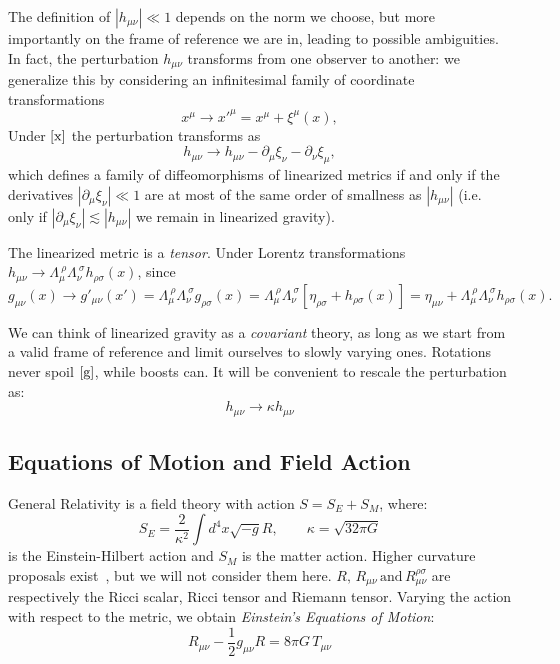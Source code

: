 \documentclass[12pt,a4paper,oneside]{article}
\numberwithin{equation}{section}   %
\begin{document}
The definition of $|h_{\mu\nu}|\ll1$ depends on the norm we choose, but more 
importantly on 
the frame of reference we are in, leading to possible ambiguities.
In fact, the perturbation $h_{\mu\nu}$ transforms from one observer to another:
we generalize this by considering an infinitesimal family of coordinate transformations
\begin{equation}
x^\mu \rightarrow x'^\mu = x^\mu + \xi^\mu(x), \label{x}
\end{equation}
Under $\eqref{x}$ the perturbation transforms as
\begin{equation}\label{gauge}
\boxed{h_{\mu\nu} \to h_{\mu\nu} - \partial_\mu \xi_\nu - \partial_\nu \xi_\mu},    
\end{equation}
which defines a family of diffeomorphisms 
of linearized metrics if and only if the derivatives 
$|\partial_\mu \xi_\nu| \ll 1$ are at most of the same order of 
smallness as $|h_{\mu\nu}|$ (i.e. only if $|\partial_\mu \xi_\nu| \lesssim |h_{\mu\nu}|$
we remain in linearized gravity).

The linearized metric is a \textit{tensor}. Under Lorentz transformations 
$h_{\mu\nu} \to \Lambda_{\mu}^{\ \rho}
\Lambda_{\nu}^{\ \sigma}
h_{\rho\sigma}(x)$, since
\begin{equation}
g_{\mu\nu}(x)
\rightarrow
g'_{\mu\nu}(x')
=
\Lambda_{\mu}^{\ \rho}
\Lambda_{\nu}^{\ \sigma}
g_{\rho\sigma}(x)
=
\Lambda_{\mu}^{\ \rho}
\Lambda_{\nu}^{\ \sigma}
\left[
\eta_{\rho\sigma}
+
h_{\rho\sigma}(x)
\right]
=
\eta_{\mu\nu}
+
\Lambda_{\mu}^{\ \rho}
\Lambda_{\nu}^{\ \sigma}
h_{\rho\sigma}(x).
\end{equation}

We can think of linearized gravity as a \textit{covariant} theory,
as long as we start from a valid frame of reference and
 limit ourselves to slowly varying ones. 
Rotations never spoil $\eqref{g}$, while boosts can. It will be
convenient to rescale the perturbation as:
\begin{equation}
    \boxed{
    h_{\mu\nu} \rightarrow \kappa h_{\mu\nu}}
\end{equation}




\subsection{Equations of Motion and Field Action}
General Relativity is a field theory with action $S = S_E +S_M$, where:
\begin{equation}
    S_E = \frac{2}{\kappa^2}\int d^4x \sqrt{-g} R, \qquad \kappa =\sqrt{32\pi G}
\end{equation}
is the Einstein-Hilbert action and $S_M$ is the matter action. Higher curvature 
proposals exist~\cite{Stelle1978}, but we will not consider them here. $R, \, R_{\mu\nu} \,\text{and}\,
R_{\mu\nu}^{\rho\sigma}$ are respectively the Ricci scalar, Ricci tensor and Riemann tensor. 
Varying the action with respect to the metric, we obtain \textit{Einstein's Equations of Motion}:
\begin{equation}
R_{\mu\nu} - \frac{1}{2}g_{\mu\nu}R = 8\pi G\, T_{\mu\nu}\label{EOM}
\end{equation}
\end{document}
